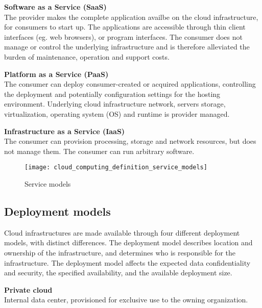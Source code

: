 \textbf{Software as a Service (SaaS)}\\
The provider makes the complete application availbe on the cloud infrastructure, for consumers to start up. The applications are accessible through thin client interfaces (eg. web browsers), or program interfaces. The consumer does not manage or control the underlying infrastructure and is therefore alleviated the burden of maintenance, operation and support costs\cite{youseff2008toward}.


\textbf{Platform as a Service (PaaS)}\\
The consumer can deploy consumer-created or acquired applications, controlling the deployment and potentially configuration settings for the hosting environment. Underlying cloud infrastructure network, servers storage, virtualization, operating system (OS) and runtime is provider managed.

\textbf{Infrastructure as a Service (IaaS)}\\
The consumer can provision processing, storage and network resources, but does not manage them. The consumer can run arbitrary software.

\begin{figure}[!htb]
  \texttt{[image: cloud\_computing\_definition\_service\_models]}  
  \caption{Service models}
  \label{fig:cloud_computing_definition_service_models}
\end{figure}


\subsection{Deployment models}
Cloud infrastructures are made available through four different deployment models, with distinct differences. The deployment model describes  location and ownership of the infrastructure, and determines who is responsible for the infrastructure. The deployment model affects the expected data confidentiality and security, the specified availability, and the available deployment size.


\textbf{Private cloud}\\
Internal data center, provisioned for exclusive use to the owning organization.


